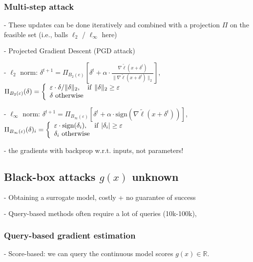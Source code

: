\subsubsection*{Multi-step attack}


- These updates can be done iteratively and combined with a projection $\Pi$ on the feasible set (i.e., balls $\ell_2$ / $\ell_\infty$ here)

- Projected Gradient Descent (PGD attack)

- $\ell_2$ norm:
$\delta^{t+1}=\Pi_{B_{2}(e)} [\delta^{t}+\alpha\cdot\frac{\nabla\tilde{\ell}(x+\delta^{t})}{\|\nabla\tilde{\ell}(x+\delta^{t})\|_{2}}]$,
$\Pi_{B_{2}(\varepsilon)}(\delta)=\left\{\begin{array}{l l}{\varepsilon\cdot\delta/\|\delta\|_{2},\quad{\mathrm{if~}}\|\delta\|_{2}\geq\varepsilon}\\ {\delta \mathrm{~otherwise}}\end{array}\right.$

- $\ell_\infty$ norm:
$\delta^{t+1}=\Pi_{B_{\infty}(\varepsilon)}\left[\delta^{t}+\alpha\cdot\mathrm{sign}(\nabla\tilde{\ell}(x+\delta^{t}))\right]$,
$\Pi_{B_{\infty}(\varepsilon)}(\delta)_i=\left\{\begin{array}{l l}{\varepsilon\cdot\mathrm{sign}(\delta_{i}),\ \ \ \mathrm{if}\ |\delta_{i}|\geq\varepsilon}\\ {\delta_i \mathrm{~otherwise}}\end{array}\right.$

- the gradients with backprop w.r.t. inputs, not parameters!


\subsection*{Black-box attacks $g(x)$ unknown}

- Obtaining a surrogate model, costly + no guarantee of success

- Query-based methods often require a lot of queries (10k-100k), 

\subsubsection*{Query-based gradient estimation}

- Score-based: we can query the continuous model scores $g(x)\in \mathbb{R}$. 

